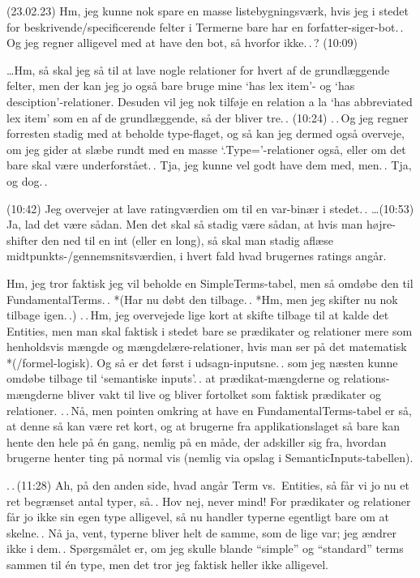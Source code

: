 \documentclass{report}
\begin{document}
(23.02.23) Hm, jeg kunne nok spare en masse listebygningsværk, hvis jeg i stedet for beskrivende/specificerende felter i Termerne bare har en forfatter-siger-bot.\,. Og jeg regner alligevel med at have den bot, så hvorfor ikke.\,.\,? (10:09)

\ldots Hm, så skal jeg så til at lave nogle relationer for hvert af de grundlæggende felter, men der kan jeg jo også bare bruge mine `has lex item'- og `has desciption'-relationer. Desuden vil jeg nok tilføje en relation a la  `has abbreviated lex item' som en af de grundlæggende, så der bliver tre.\,. (10:24) .\,.\,Og jeg regner forresten stadig med at beholde type-flaget, og så kan jeg dermed også overveje, om jeg gider at slæbe rundt med en masse `.Type='-relationer også, eller om det bare skal være underforstået.\,. Tja, jeg kunne vel godt have dem med, men.\,. Tja, og dog.\,. 

(10:42) Jeg overvejer at lave ratingværdien om til en var-binær i stedet.\,. \ldots (10:53) Ja, lad det være sådan. Men det skal så stadig være sådan, at hvis man højre-shifter den ned til en int (eller en long), så skal man stadig aflæse midtpunkts-/gennemsnitsværdien, i hvert fald hvad brugernes ratings angår. 

Hm, jeg tror faktisk jeg vil beholde en SimpleTerms-tabel, men så omdøbe den til FundamentalTerms.\,. *(Har nu døbt den tilbage.\,. *Hm, men jeg skifter nu nok tilbage igen.\,.) .\,.\,Hm, jeg overvejede lige kort at skifte tilbage til at kalde det Entities, men man skal faktisk i stedet bare se prædikater og relationer mere som henholdsvis mængde og mængdelære-relationer, hvis man ser på det matematisk *(/formel-logisk). Og så er det først i udsagn-inputsne.\,. som jeg næsten kunne omdøbe tilbage til `semantiske inputs'.\,. at prædikat-mængderne og relations-mængderne bliver vakt til live og bliver fortolket som faktisk prædikater og relationer. .\,.\,Nå, men pointen omkring at have en FundamentalTerms-tabel er så, at denne så kan være ret kort, og at brugerne fra applikationslaget så bare kan hente den hele på én gang, nemlig på en måde, der adskiller sig fra, hvordan brugerne henter ting på normal vis (nemlig via opslag i SemanticInputs-tabellen). 

.\,.\,(11:28) Ah, på den anden side, hvad angår Term vs.\ Entities, så får vi jo nu et ret begrænset antal typer, så.\,. Hov nej, never mind! For prædikater og relationer får jo ikke sin egen type alligevel, så nu handler typerne egentligt bare om at skelne.\,. Nå ja, vent, typerne bliver helt de samme, som de lige var; jeg ændrer ikke i dem.\,. Spørgsmålet er, om jeg skulle blande ``simple'' og ``standard'' terms sammen til én type, men det tror jeg faktisk heller ikke alligevel. 
\end{document}

